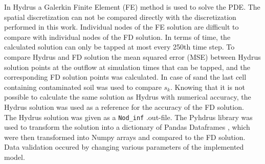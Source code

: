 In Hydrus a Galerkin Finite Element (FE) method is used to solve the PDE. The spatial discretization can not be compared directly with the discretization performed in this work. Individual nodes of the FE solution are difficult to compare with individual nodes of the FD solution. In terms of time, the calculated solution can only be tapped at most every 250th time step. To compare Hydrus and FD solution the mean squared error (MSE) between Hydrus solution points at the outflow at simulation times that can be tapped, and the corresponding FD solution points was calculated. In case of sand the last cell containing contaminated soil was used to compare $s_k$. Knowing that it is not possible to calculate the same solution as Hydrus with numerical accuracy, the Hydrus solution was used as a reference for the accuracy of the FD solution.\\
The Hydrus solution was given as a \texttt{Nod\_inf} .out-file. The Pyhdrus \cite{pyhydrus} library was used to transform the solution into a dictionary of Pandas Dataframes \cite{reback2020pandas}, which were then transformed into Numpy arrays and compared to the FD solution. Data validation occured by changing various parameters of the implemented model.
